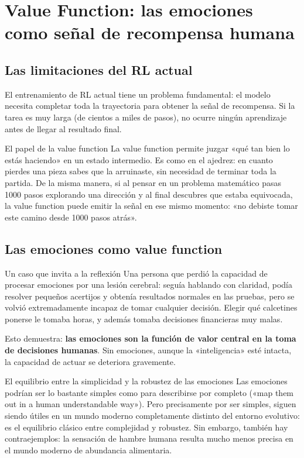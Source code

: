 \section{Value Function: las emociones como señal de recompensa humana}

\subsection{Las limitaciones del RL actual}

El entrenamiento de RL actual tiene un problema fundamental: el modelo necesita completar toda la trayectoria para obtener la señal de recompensa. Si la tarea es muy larga (de cientos a miles de pasos), no ocurre ningún aprendizaje antes de llegar al resultado final.

\begin{importantbox}{El papel de la value function}
La value function permite juzgar «qué tan bien lo estás haciendo» en un estado intermedio. Es como en el ajedrez: en cuanto pierdes una pieza sabes que la arruinaste, sin necesidad de terminar toda la partida. De la misma manera, si al pensar en un problema matemático pasas 1000 pasos explorando una dirección y al final descubres que estaba equivocada, la value function puede emitir la señal en ese mismo momento: «no debiste tomar este camino desde 1000 pasos atrás».
\end{importantbox}

\subsection{Las emociones como value function}

\begin{importantbox}{Un caso que invita a la reflexión}
Una persona que perdió la capacidad de procesar emociones por una lesión cerebral: seguía hablando con claridad, podía resolver pequeños acertijos y obtenía resultados normales en las pruebas, pero se volvió extremadamente incapaz de tomar cualquier decisión. Elegir qué calcetines ponerse le tomaba horas, y además tomaba decisiones financieras muy malas.

Esto demuestra: \textbf{las emociones son la función de valor central en la toma de decisiones humanas}. Sin emociones, aunque la «inteligencia» esté intacta, la capacidad de actuar se deteriora gravemente.
\end{importantbox}

\begin{knowledgebox}{El equilibrio entre la simplicidad y la robustez de las emociones}
Las emociones podrían ser lo bastante simples como para describirse por completo («map them out in a human understandable way»). Pero precisamente por ser simples, siguen siendo útiles en un mundo moderno completamente distinto del entorno evolutivo: es el equilibrio clásico entre complejidad y robustez. Sin embargo, también hay contraejemplos: la sensación de hambre humana resulta mucho menos precisa en el mundo moderno de abundancia alimentaria.
\end{knowledgebox}

